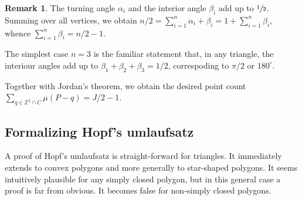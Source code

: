 \documentclass[a4paper]{amsart}
\numberwithin{equation}{section}
\theoremstyle{plain}
\theoremstyle{definition}
\newtheorem{remark}[theorem]{Remark}
\newcommand{\Z}{\mathbb{Z}}
\begin{document}
\begin{remark}
  The turning angle $\alpha_i$ and the interior angle $\beta_i$
  add up to $\sfrac{1}{2}$.  Summing over all vertices, we obtain
  $n/2 = \sum_{i=1}^n \alpha_i + \beta_i = 1 + \sum_{i=1}^n \beta_i$,
  whence $\sum_{i=1}^n \beta_i = n/2 - 1$.

  The simplest case $n=3$ is the familiar statement that,
  in any triangle, the interiour angles add up
  to $\beta_1 + \beta_2 + \beta_3 = 1/2$,
  correspoding to $\pi/2$ or $180^\circ$.
\end{remark}

Together with Jordan's theorem, we obtain the desired
point count $\sum_{q \in \Z^2 \cap C} \mu(P-q) = J/2 - 1$.


\subsection{Formalizing Hopf's umlaufsatz}

A proof of Hopf's umlaufsatz is straight-forward for triangles.
It immediately extends to convex polygons and
more generally to star-shaped polygons.
It seems intuitively plausible for any simply closed polygon,
but in this general case a proof is far from obvious.
It becomes false for non-simply closed polygons.
\end{document}
